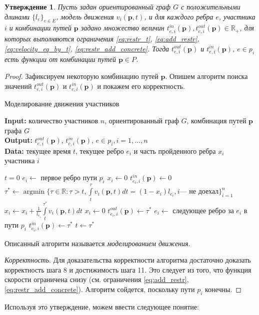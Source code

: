 \documentclass[12pt, a4paper]{article}
\DeclareMathOperator*{\argmin}{argmin}
\newtheorem{state}{Утверждение}[section]
\begin{document}
\begin{state}
\label{state:modeling}
Пусть задан ориентированный граф $G$ с положительными длинами $\{l_e\}_{e \in E}$, модель движения $v_i(\textbf{p}, t)$, и для каждого ребра $e$, участника $i$ и комбинации путей $\textbf{p}$ задано множество величин $t_{e, i}^{in}(\textbf{p}), t_{e, i}^{out}(\textbf{p}) \in \mathbb{R}_+$, для которых выполняются ограничения \eqref{eq:restr_t}, \eqref{eq:add_restr}, \eqref{eq:velocity_eq_by_t}, \eqref{eq:restr_add_concrete}. Тогда $t_{e, i}^{out}(\textbf{p})$ и $t_{e, i}^{in}(\textbf{p})$, $e \in p_i$ есть функции от комбинации путей $\textbf{p} \in P$.
\end{state}
\begin{proof}
Зафиксируем некоторую комбинацию путей $\textbf{p}$. Опишем алгоритм поиска значений $t_{e, i}^{out}(\textbf{p})$ и $t_{e, i}^{in}(\textbf{p})$ и покажем его корректность.

\begin{algorithm}[H]
	\caption{Моделирование движения участников}
	\label{alg:modeling}
	{\bf {Input:}} количество участников $n$, ориентированный граф $G$, комбинация путей $\textbf{p}$ графа $G$\\
	{\bf {Output:}} $t_{e, i}^{out}(\textbf{p})$, $t_{e, i}^{in}(\textbf{p})$, $e \in p_i, i = 1, \ldots, n$\\
	{\bf {Data:}} текущее время $t$, текущее ребро $e_i$ и часть пройденного ребра $x_i$ участника $i$
	\begin{algorithmic}[1]
		\State $t = 0$
		\State $e_i \gets$ { первое ребро пути $p_i$}
		\State $x_i \gets 0$
		\State $t_{e_i, i}^{in}(\textbf{p}) \gets 0$ 
		\EndFor
		\State $\tau^* \gets \argmin\{ \tau \in \mathbb{R}: \tau > t, \int\limits_{t}^{\tau} v_i(\textbf{p}, t) dt = (1 - x_i) l_{e_i}, i \text{--- не доехал}  \}_{i = 1}^n$
		\State $x_i \gets x_i + \frac{1}{l_{e_i}} \int\limits_{t}^{\tau^*} v_i(\textbf{p}, t) dt$
				\State $x_i \gets 0$
				\State $t_{e_i, i}^{out}(\textbf{p}) \gets \tau^*$ 
				\State $e_i \gets$ следующее ребро за $e_i$ в пути $p_i$
				\State $t_{e_i, i}^{in}(\textbf{p}) \gets \tau^*$ 
			\EndIf
		\EndFor
		\State $t \gets \tau^*$
		\EndWhile
	\end{algorithmic}
\end{algorithm}


Описанный алгоритм называется \textit{моделированием движения}.

\textit{Корректность}. Для доказательства корректности алгоритма достаточно доказать корректность шага 8 и достижимость шага 11. Это следует из того, что функция скорости ограничена снизу (см. ограничения \eqref{eq:add_restr}, \eqref{eq:restr_add_concrete}). Алгоритм сойдется, поскольку пути $p_i$ конечны.

\end{proof}
 Используя это утверждение, можем ввести следующее понятие:
\end{document}
